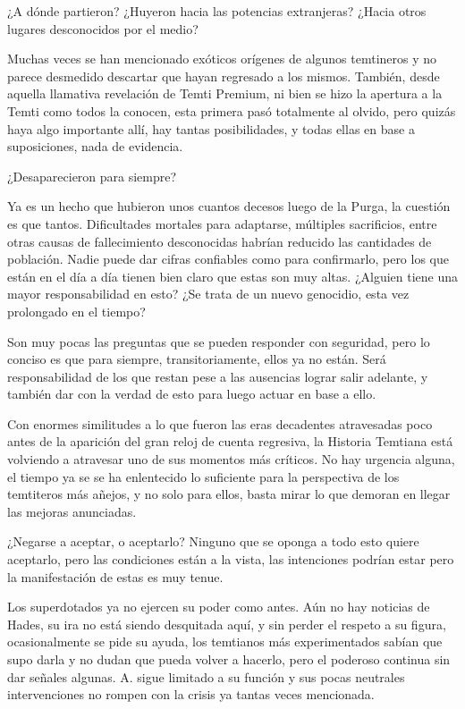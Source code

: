 \documentclass[
  spanish,
]{book}
\begin{document}
¿A dónde partieron? ¿Huyeron hacia las potencias extranjeras? ¿Hacia otros lugares desconocidos por el medio?

Muchas veces se han mencionado exóticos orígenes de algunos temtineros y no parece desmedido descartar que hayan regresado a los mismos. También, desde aquella llamativa revelación de Temti Premium, ni bien se hizo la apertura a la Temti como todos la conocen, esta primera pasó totalmente al olvido, pero quizás haya algo importante allí, hay tantas posibilidades, y todas ellas en base a suposiciones, nada de evidencia.

¿Desaparecieron para siempre?

Ya es un hecho que hubieron unos cuantos decesos luego de la Purga, la cuestión es que tantos. Dificultades mortales para adaptarse, múltiples sacrificios, entre otras causas de fallecimiento desconocidas habrían reducido las cantidades de población. Nadie puede dar cifras confiables como para confirmarlo, pero los que están en el día a día tienen bien claro que estas son muy altas. ¿Alguien tiene una mayor responsabilidad en esto? ¿Se trata de un nuevo genocidio, esta vez prolongado en el tiempo?

Son muy pocas las preguntas que se pueden responder con seguridad, pero lo conciso es que para siempre, transitoriamente, ellos ya no están. Será responsabilidad de los que restan pese a las ausencias lograr salir adelante, y también dar con la verdad de esto para luego actuar en base a ello.

Con enormes similitudes a lo que fueron las eras decadentes atravesadas poco antes de la aparición del gran reloj de cuenta regresiva, la Historia Temtiana está volviendo a atravesar uno de sus momentos más críticos. No hay urgencia alguna, el tiempo ya se se ha enlentecido lo suficiente para la perspectiva de los temtiteros más añejos, y no solo para ellos, basta mirar lo que demoran en llegar las mejoras anunciadas.

¿Negarse a aceptar, o aceptarlo? Ninguno que se oponga a todo esto quiere aceptarlo, pero las condiciones están a la vista, las intenciones podrían estar pero la manifestación de estas es muy tenue.

Los superdotados ya no ejercen su poder como antes. Aún no hay noticias de Hades, su ira no está siendo desquitada aquí, y sin perder el respeto a su figura, ocasionalmente se pide su ayuda, los temtianos más experimentados sabían que supo darla y no dudan que pueda volver a hacerlo, pero el poderoso continua sin dar señales algunas. A. sigue limitado a su función y sus pocas neutrales intervenciones no rompen con la crisis ya tantas veces mencionada.
\end{document}
